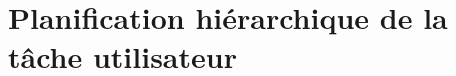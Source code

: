 \newcommand{\option}[1]{\textbf{\texttt{#1}}}

\section{Planification hiérarchique de la tâche utilisateur}

\newcommand{\phtu}[5]
{
    \addtocounter{ndau}{1}
    \setcounter{nacteur}{#1}
    \begin{center}
    \begin{longtable}{|p{11cm}|c|}
	\hline
	    DAU \thendau & DTU/DF #2 \\
	\hline
	    \multicolumn{2}{|l|}{U#1 -- #3} \\
	\hline
	    \multicolumn{2}{|l|}{#4}\\
	\hline
	    #5 
    \hline
\end{longtable}
\end{center}
}
    
